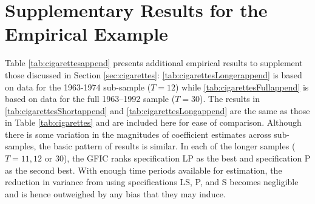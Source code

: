 \section{Supplementary Results for the Empirical Example}
\label{sec:append_empirical}

Table \ref{tab:cigarettesappend} presents additional empirical results to supplement those discussed in Section \ref{sec:cigarettes}: \ref{tab:cigarettesLongerappend} is based on data for the 1963-1974 sub-sample ($T = 12$) while \ref{tab:cigarettesFullappend} is based on data for the full 1963--1992 sample ($T=30$).
The results in \ref{tab:cigarettesShortappend} and \ref{tab:cigarettesLongappend} are the same as those in Table \ref{tab:cigarettes} and are included here for ease of comparison.
Although there is some variation  in the magnitudes of coefficient estimates across sub-samples, the basic pattern of results is similar.
In each of the longer samples ($T=11, 12$ or $30$), the GFIC ranks specification LP as the best and specification P as the second best.
With enough time periods available for estimation, the reduction in  variance from using specifications LS, P, and S becomes negligible and is hence outweighed by any bias that they may induce.



